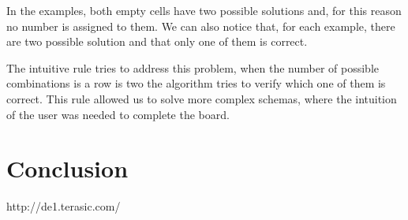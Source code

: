 \documentclass[12pt]{report}
\begin{document}
In the examples, both empty cells have two possible solutions and, for this
reason no number is assigned to them. We can also notice that, for each
example, there are two possible solution and that only one of them is
correct.

The intuitive rule tries to address this problem, when the number of
possible combinations is a row is two the algorithm tries to verify which
one of them is correct. This rule allowed us to solve more complex
schemas, where the intuition of the user was needed to complete the board.

\chapter*{Conclusion}


\renewcommand{\bibname}{References}
\begin{thebibliography}{100}

 http://de1.terasic.com/

\end{thebibliography}
\end{document}

